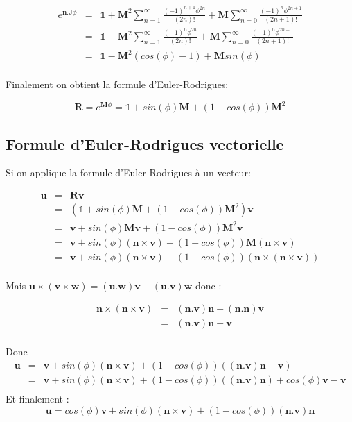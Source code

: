 \documentclass[12pt,a4paper]{article}
\newcommand{\unit}
{
\bm{\mathds{1}}
}
\begin{document}
	\begin{eqnarray*}
	e^{\bm{n}.\bm{J}\phi}&=& \unit+\bm{M}^2\sum_{n=1}^{\infty} \frac{(-1)^{n+1} \phi^{2n}}{(2n)!} + \bm{M}\sum_{n=0}^{\infty} \frac{(-1)^{n}\phi^{2n+1}}{(2n+1)!}\\
	&=& \unit-\bm{M}^2\sum_{n=1}^{\infty} \frac{(-1)^{n} \phi^{2n}}{(2n)!} + \bm{M}\sum_{n=0}^{\infty} \frac{(-1)^{n}\phi^{2n+1}}{(2n+1)!}\\
	&=& \unit-\bm{M}^2 (cos(\phi)-1) + \bm{M} sin(\phi)\\
	\end{eqnarray*}
	
	Finalement on obtient la formule d'Euler-Rodrigues:
	
	\[
	\boxed{\bm{R}=e^{\bm{M}\phi}=\unit+sin(\phi)\bm{M}+(1-cos(\phi))\bm{M}^2 }
	\]
	
	\newpage
	\subsection{Formule d'Euler-Rodrigues vectorielle}
	
	Si on applique la formule d'Euler-Rodrigues à un vecteur:
	
	\begin{eqnarray*}
	\bm{u}&=& \bm{R} \bm{v} \\
	&=& (\unit+sin(\phi)\bm{M}+(1-cos(\phi))\bm{M}^2) \bm{v} \\
	&=& \bm{v}+sin(\phi)\bm{M}\bm{v}+(1-cos(\phi))\bm{M}^2\bm{v}  \\
	&=& \bm{v}+sin(\phi)(\bm{n}\times \bm{v})+(1-cos(\phi))\bm{M} (\bm{n}\times \bm{v})  \\
	&=& \bm{v}+sin(\phi)(\bm{n}\times \bm{v})+(1-cos(\phi)) (\bm{n}\times (\bm{n}\times \bm{v}))  \\
	\end{eqnarray*}
	
Mais $\bm{u}\times(\bm{v}\times \bm{w})=(\bm{u}.\bm{w})\bm{v}-(\bm{u}.\bm{v})\bm{w}$ donc :
    
    \begin{eqnarray*}
    \bm{n}\times(\bm{n}\times \bm{v})&=&(\bm{n}.\bm{v})\bm{n}-(\bm{n}.\bm{n})\bm{v}\\
	&=&(\bm{n}.\bm{v})\bm{n}-\bm{v}\\	
	\end{eqnarray*}

Donc 
	\begin{eqnarray*}
		\bm{u}&=& \bm{v}+sin(\phi)(\bm{n}\times \bm{v})+(1-cos(\phi)) ((\bm{n}.\bm{v})\bm{n}-\bm{v})  \\
		&=& \bm{v}+sin(\phi)(\bm{n}\times \bm{v})+(1-cos(\phi)) ((\bm{n}.\bm{v})\bm{n})+cos(\phi)\bm{v}-\bm{v}  \\
	\end{eqnarray*}
Et finalement :
\[
\boxed{\bm{u}= cos(\phi)\bm{v}+sin(\phi)(\bm{n}\times \bm{v})+(1-cos(\phi)) (\bm{n}.\bm{v})\bm{n} }
\]
\end{document}
